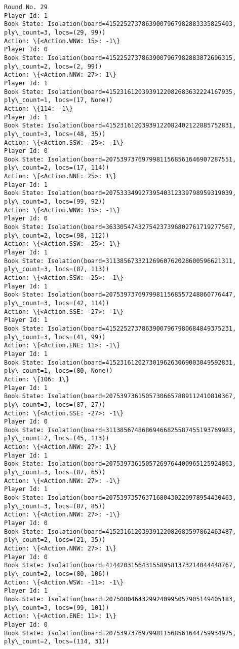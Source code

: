 \documentclass[11pt]{article}
\begin{document}
\begin{Verbatim}[commandchars=\\\{\}]
Round No. 29
Player Id: 1
Book State: Isolation(board=41522527378639007967982883335825403, ply\_count=3, locs=(29, 99))
Action: \{<Action.WNW: 15>: -1\}
Player Id: 0
Book State: Isolation(board=41522527378639007967982883872696315, ply\_count=2, locs=(2, 99))
Action: \{<Action.NNW: 27>: 1\}
Player Id: 1
Book State: Isolation(board=41523161203939122082683632224167935, ply\_count=1, locs=(17, None))
Action: \{114: -1\}
Player Id: 1
Book State: Isolation(board=41523161203939122082402122885752831, ply\_count=3, locs=(48, 35))
Action: \{<Action.SSW: -25>: -1\}
Player Id: 0
Book State: Isolation(board=20753973769799811568561646907287551, ply\_count=2, locs=(17, 114))
Action: \{<Action.NNE: 25>: 1\}
Player Id: 1
Book State: Isolation(board=20753334992739540312339798959319039, ply\_count=3, locs=(99, 92))
Action: \{<Action.WNW: 15>: -1\}
Player Id: 0
Book State: Isolation(board=36330547432754237396802761719277567, ply\_count=2, locs=(98, 112))
Action: \{<Action.SSW: -25>: 1\}
Player Id: 1
Book State: Isolation(board=31138567332126960762028600596621311, ply\_count=3, locs=(87, 113))
Action: \{<Action.SSW: -25>: -1\}
Player Id: 1
Book State: Isolation(board=20753973769799811568557248860776447, ply\_count=3, locs=(42, 114))
Action: \{<Action.SSE: -27>: -1\}
Player Id: 1
Book State: Isolation(board=41522527378639007967980684849375231, ply\_count=3, locs=(41, 99))
Action: \{<Action.ENE: 11>: -1\}
Player Id: 1
Book State: Isolation(board=41523161202730196263069003049592831, ply\_count=1, locs=(80, None))
Action: \{106: 1\}
Player Id: 1
Book State: Isolation(board=20753973615057306657889112410810367, ply\_count=3, locs=(87, 27))
Action: \{<Action.SSE: -27>: -1\}
Player Id: 0
Book State: Isolation(board=31138567486869466825587455193769983, ply\_count=2, locs=(45, 113))
Action: \{<Action.NNW: 27>: 1\}
Player Id: 1
Book State: Isolation(board=20753973615057269764400965125924863, ply\_count=3, locs=(87, 65))
Action: \{<Action.NNW: 27>: -1\}
Player Id: 1
Book State: Isolation(board=20753973576371680430220978954430463, ply\_count=3, locs=(87, 85))
Action: \{<Action.NNW: 27>: -1\}
Player Id: 0
Book State: Isolation(board=41523161203939122082683597862463487, ply\_count=2, locs=(21, 35))
Action: \{<Action.NNW: 27>: 1\}
Player Id: 0
Book State: Isolation(board=41442031564315589581373214044448767, ply\_count=2, locs=(80, 106))
Action: \{<Action.WSW: -11>: -1\}
Player Id: 1
Book State: Isolation(board=20750804643299240995057905149405183, ply\_count=3, locs=(99, 101))
Action: \{<Action.ENE: 11>: 1\}
Player Id: 0
Book State: Isolation(board=20753973769799811568561644759934975, ply\_count=2, locs=(114, 31))

\end{Verbatim}
\end{document}
